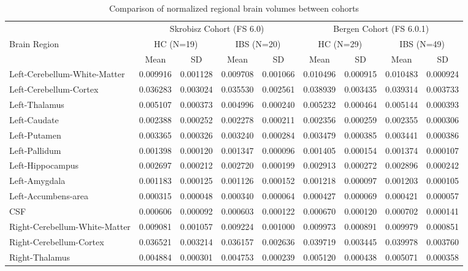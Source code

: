 \begin{table}[H]
\setlength{\tabcolsep}{5pt}
\centering
\footnotesize
\caption{Comparison of normalized regional brain volumes between cohorts}
\begin{tabular}{lcccccccc}
\hline
 & \multicolumn{4}{c}{Skrobisz Cohort (FS 6.0)} & \multicolumn{4}{c}{Bergen Cohort (FS 6.0.1)} \\
Brain Region & \multicolumn{2}{c}{HC (N=19)} & \multicolumn{2}{c}{IBS (N=20)} & \multicolumn{2}{c}{HC (N=29)} & \multicolumn{2}{c}{IBS (N=49)} \\
  & Mean & SD & Mean & SD & Mean & SD & Mean & SD \\\hline
Left-Cerebellum-White-Matter & 0.009916 & 0.001128 & 0.009708 & 0.001066 & 0.010496 & 0.000915 & 0.010483 & 0.000924 \\
Left-Cerebellum-Cortex & 0.036283 & 0.003024 & 0.035530 & 0.002561 & 0.038939 & 0.003435 & 0.039314 & 0.003733 \\
Left-Thalamus & 0.005107 & 0.000373 & 0.004996 & 0.000240 & 0.005232 & 0.000464 & 0.005144 & 0.000393 \\
Left-Caudate & 0.002388 & 0.000252 & 0.002278 & 0.000211 & 0.002356 & 0.000259 & 0.002355 & 0.000306 \\
Left-Putamen & 0.003365 & 0.000326 & 0.003240 & 0.000284 & 0.003479 & 0.000385 & 0.003441 & 0.000386 \\
Left-Pallidum & 0.001398 & 0.000120 & 0.001347 & 0.000096 & 0.001405 & 0.000154 & 0.001374 & 0.000107 \\
Left-Hippocampus & 0.002697 & 0.000212 & 0.002720 & 0.000199 & 0.002913 & 0.000272 & 0.002896 & 0.000242 \\
Left-Amygdala & 0.001183 & 0.000125 & 0.001126 & 0.000152 & 0.001218 & 0.000097 & 0.001203 & 0.000105 \\
Left-Accumbens-area & 0.000315 & 0.000048 & 0.000340 & 0.000064 & 0.000427 & 0.000069 & 0.000421 & 0.000057 \\
CSF & 0.000606 & 0.000092 & 0.000603 & 0.000122 & 0.000670 & 0.000120 & 0.000702 & 0.000141 \\
Right-Cerebellum-White-Matter & 0.009081 & 0.001057 & 0.009224 & 0.001000 & 0.009973 & 0.000891 & 0.009979 & 0.000851 \\
Right-Cerebellum-Cortex & 0.036521 & 0.003214 & 0.036157 & 0.002636 & 0.039719 & 0.003445 & 0.039978 & 0.003760 \\
Right-Thalamus & 0.004884 & 0.000301 & 0.004753 & 0.000239 & 0.005120 & 0.000438 & 0.005071 & 0.000358 \\

\end{tabular}
\end{table}
